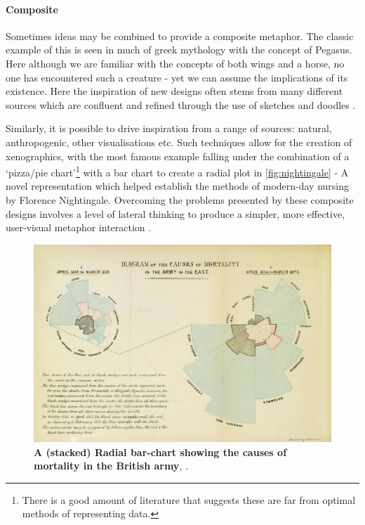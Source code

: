 \paragraph*{Composite}


Sometimes ideas may be combined to provide a composite metaphor. The classic example of this is seen in much of greek mythology with the concept of Pegasus. Here although we are familiar with the concepts of both wings and a horse, no one has encountered such a creature - yet we can assume the implications of its existence.
Here the inspiration of new designs often stems from many different sources which are confluent and refined through the use of sketches and doodles \cite{fds}. 

Similarly, it is possible to drive inspiration from a range of sources: natural, anthropogenic, other visualisations etc. 
Such techniques allow for the creation of xenographics, with the most famous example falling under the combination of a `pizza/pie chart'\footnote{There is a good amount of literature that suggests these are far from optimal methods of representing data. } with a bar chart to create a radial plot in \autoref{fig:nightingale} - A novel representation which helped establish the methods of modern-day nursing by Florence Nightingale. 
Overcoming the problems presented by these composite designs involves a level of lateral thinking to produce a simpler, more effective, user-visual metaphor interaction \cite{shapinginfo}. 



\begin{figure}[H]
     \centering
         \includegraphics[width=.75\textwidth]{figures_c1/nightingale.jpg}
        \caption[Caption for LOF]{\textbf{A (stacked) Radial bar-chart showing the causes of mortality in the British army}\protect\footnotemark , \cite{nightingale}.}
        \label{fig:nightingale}
\end{figure}




